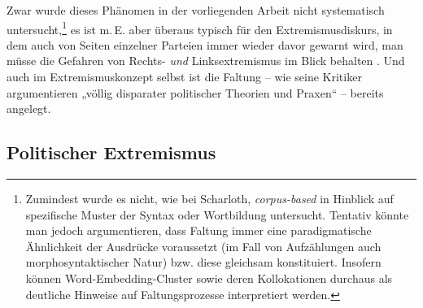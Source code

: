 Zwar wurde dieses Phänomen in der vorliegenden Arbeit nicht systematisch untersucht,\footnote{Zumindest wurde es nicht, wie bei Scharloth, \emph{corpus-based} in Hinblick auf spezifische Muster der Syntax oder Wortbildung untersucht. Tentativ könnte man jedoch argumentieren, dass Faltung immer eine paradigmatische Ähnlichkeit der Ausdrücke voraussetzt (im Fall von Aufzählungen auch morphosyntaktischer Natur) bzw. diese gleichsam konstituiert. Insofern können Word-Embedding-Cluster sowie deren Kollokationen durchaus als deutliche Hinweise auf Faltungsprozesse interpretiert werden.} es ist m.\,E. aber überaus typisch für den Extremismusdiskurs, in dem auch von Seiten einzelner Parteien immer wieder davor gewarnt wird, man müsse die Gefahren von Rechts- \emph{und} Linksextremismus im Blick behalten \autocite[siehe auch die Beispiele zu Faltungen von „Linken und Moslems`` bzw. „Islamisten`` bei][230, Tabelle 4]{scharlothFaltungenSchliessungRechten2022}. Und auch im Extremismuskonzept selbst ist die Faltung -- wie seine Kritiker argumentieren „völlig disparater politischer Theorien und Praxen`` \autocite[46]{oppenhaeuserExtremismusKonzeptUndProduktion2011} -- bereits angelegt.

\subsection{Politischer Extremismus}\label{politischer-extremismus}

